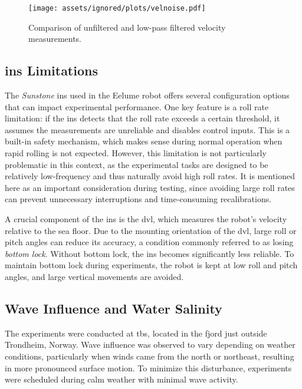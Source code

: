 \begin{figure}[h!]
    \centering
    \texttt{[image: assets/ignored/plots/velnoise.pdf]}
    \caption{Comparison of unfiltered and low-pass filtered velocity measurements.}
    \label{fig:eelume:velocity-noise-low-pass-comp}
\end{figure}

\subsection*{\gls{ins} Limitations}
The \textit{Sunstone} \gls{ins} used in the Eelume robot offers several configuration options that can impact experimental performance. One key feature is a roll rate limitation: if the \gls{ins} detects that the roll rate exceeds a certain threshold, it assumes the measurements are unreliable and disables control inputs. This is a built-in safety mechanism, which makes sense during normal operation when rapid rolling is not expected. However, this limitation is not particularly problematic in this context, as the experimental tasks are designed to be relatively low-frequency and thus naturally avoid high roll rates. It is mentioned here as an important consideration during testing, since avoiding large roll rates can prevent unnecessary interruptions and time-consuming recalibrations.

A crucial component of the \gls{ins} is the \gls{dvl}, which measures the robot’s velocity relative to the sea floor. Due to the mounting orientation of the \gls{dvl}, large roll or pitch angles can reduce its accuracy, a condition commonly referred to as losing \textit{bottom lock}. Without bottom lock, the \gls{ins} becomes significantly less reliable. To maintain bottom lock during experiments, the robot is kept at low roll and pitch angles, and large vertical movements are avoided.

\subsection*{Wave Influence and Water Salinity}
The experiments were conducted at \gls{tbs}, located in the fjord just outside 
Trondheim, Norway. Wave influence was observed to vary depending on weather 
conditions, particularly when winds came from the north or northeast, 
resulting in more pronounced surface motion. To minimize this disturbance, 
experiments were scheduled during calm weather with minimal wave activity.

